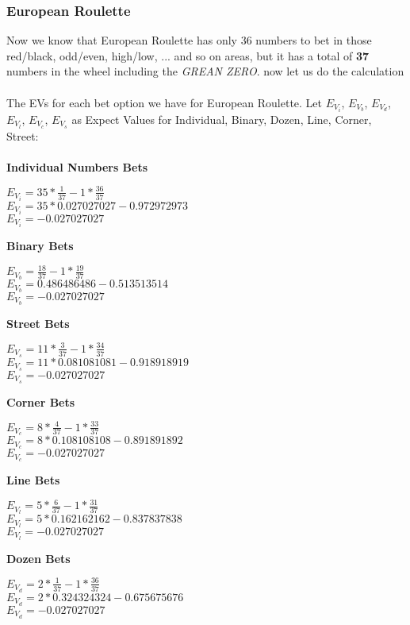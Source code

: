 \documentclass{article}
\begin{document}
\subsubsection{European Roulette}
Now we know that European Roulette has only 36 numbers to bet in those red/black, odd/even, high/low, ... and so on areas, but it has a total of \textbf{37} numbers in the wheel including the \emph{GREAN ZERO}.  now let us do the calculation\\
\\
The EVs for each bet option we have for European Roulette.  Let $E_{V_i}$, $E_{V_b}$, $E_{V_d}$, $E_{V_l}$, $E_{V_c}$, $E_{V_s}$ as Expect Values for Individual, Binary, Dozen, Line, Corner, Street:\\
\\
\textbf{Individual Numbers Bets}
\begin{center}
$E_{V_i}=35 * \frac{1}{37} - 1 * \frac{36}{37}$\\
$E_{V_i}=35*0.027027027 - 0.972972973$\\
$E_{V_i}=-0.027027027$\\
\end{center}   
\textbf{Binary Bets}
\begin{center}
$E_{V_b}=\frac{18}{37} - 1 * \frac{19}{37}$\\
$E_{V_b}=0.486486486 - 0.513513514$\\
$E_{V_b}=-0.027027027$\\
\end{center} 
\textbf{Street Bets}
\begin{center}
$E_{V_s}=11 * \frac{3}{37} - 1 * \frac{34}{37}$\\
$E_{V_s}=11*0.081081081 - 0.918918919$\\
$E_{V_s}=-0.027027027$\\
\end{center}  
\textbf{Corner Bets}
\begin{center}
$E_{V_c}=8 * \frac{4}{37} - 1 * \frac{33}{37}$\\
$E_{V_c}=8*0.108108108 - 0.891891892$\\
$E_{V_c}=-0.027027027$\\
\end{center}  
\textbf{Line Bets}
\begin{center}
$E_{V_l}=5 * \frac{6}{37} - 1 * \frac{31}{37}$\\
$E_{V_l}=5*0.162162162 - 0.837837838$\\
$E_{V_l}=-0.027027027$\\
\end{center}  
\textbf{Dozen Bets}
\begin{center}
$E_{V_d}=2 * \frac{1}{37} - 1 * \frac{36}{37}$\\
$E_{V_d}=2*0.324324324 - 0.675675676$\\
$E_{V_d}=-0.027027027$\\
\end{center}  
\end{document}
